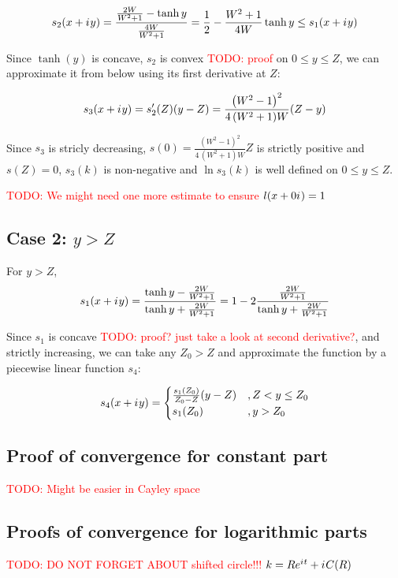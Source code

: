 \documentclass[12pt, a4paper]{article}
\newcommand{\eexp}[1]{e^{#1}}
\newcommand{\iu}{{i\mkern1mu}}
\newcommand{\todo}[1]{{\large \textcolor{red}{TODO: #1}}}
\begin{document}
\[
s_2(x + \iu y) = \frac{\frac{2 W}{W^2 + 1} - \tanh y}{\frac{4 W}{W^2 + 1}} = \frac{1}{2} - \frac{W^2 + 1}{4 W} \tanh y \le s_1(x + \iu y)
\]

Since $\tanh(y)$ is concave, $s_2$ is convex \todo{proof} on $0 \le y \le Z$, we can approximate it from below using its first derivative at $Z$:

\[
s_3(x + \iu y) = s_2'(Z)(y - Z) = \frac{{\left(W^{2} - 1\right)}^{2}}{4 \, {\left(W^{2} + 1\right)} W} (Z - y)
\]

Since $s_3$ is stricly decreasing, $s(0) = \frac{{\left(W^{2} - 1\right)}^{2}}{4 \, {\left(W^{2} + 1\right)} W} Z$ is strictly positive and $s(Z) = 0$, $s_3(k)$ is non-negative and $\ln s_3(k)$ is well defined on $0 \le y \le Z$.

\todo{We might need one more estimate to ensure $l(x + 0 \iu) = 1$}


\subsection*{Case 2: $y > Z$}
For $y > Z$, 
\[
s_1(x + \iu y) 
 = \frac{\tanh y - \frac{2 W}{W^2 + 1}}{\tanh y + \frac{2 W}{W^2 + 1}}
 = 1 - 2 \frac{\frac{2 W}{W^2 + 1}}{\tanh y + \frac{2 W}{W^2 + 1}}
\]

Since $s_1$ is concave \todo{proof? just take a look at second derivative?}, and strictly increasing, we can take any $Z_0 > Z$ and approximate the function by a piecewise linear function $s_4$:

\[
s_4(x + \iu y) = 
\begin{cases}
\frac{s_1(Z_0)}{Z_0 - Z} (y - Z) &, Z < y \le Z_0 \\
s_1(Z_0) &, y > Z_0
\end{cases}
\]


\subsection*{Proof of convergence for constant part}
\todo{Might be easier in Cayley space}

\subsection*{Proofs of convergence for logarithmic parts}
\todo{DO NOT FORGET ABOUT shifted circle!!! $k = R \eexp{\iu t} + \iu C(R)$}
\end{document}

